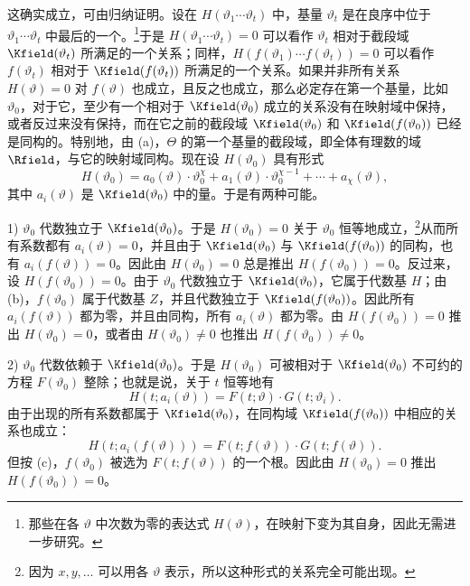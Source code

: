 这确实成立，可由归纳证明。设在 $H(\vartheta_1\cdots\vartheta_t)$ 中，基量 $\vartheta_t$ 是在良序中位于 $\vartheta_1\cdots\vartheta_t$ 中最后的一个。\footnote{那些在各 $\vartheta$ 中次数为零的表达式 $H(\vartheta)$，在映射下变为其自身，因此无需进一步研究。}于是 $H(\vartheta_1\cdots\vartheta_t)=0$ 可以看作 $\vartheta_t$ 相对于截段域 $\Kfield(\vartheta_t)$ 所满足的一个关系；同样，$H(f(\vartheta_1)\cdots f(\vartheta_t))=0$ 可以看作 $f(\vartheta_t)$ 相对于 $\Kfield(f(\vartheta_t))$ 所满足的一个关系。如果并非所有关系 $H(\vartheta)=0$ 对 $f(\vartheta)$ 也成立，且反之也成立，那么必定存在第一个基量，比如 $\vartheta_0$，对于它，至少有一个相对于 $\Kfield(\vartheta_0)$ 成立的关系没有在映射域中保持，或者反过来没有保持，而在它之前的截段域 $\Kfield(\vartheta_0)$ 和 $\Kfield(f(\vartheta_0))$ 已经是同构的。特别地，由 (a)，$\Theta$ 的第一个基量的截段域，即全体有理数的域 $\Rfield$，与它的映射域同构。现在设 $H(\vartheta_0)$ 具有形式
\[
H(\vartheta_0)=a_0(\vartheta)\cdot\vartheta_0^\chi
+a_1(\vartheta)\cdot\vartheta_0^{\chi-1}+\cdots+a_\chi(\vartheta),
\]
其中 $a_i(\vartheta)$ 是 $\Kfield(\vartheta_0)$ 中的量。于是有两种可能。

1) $\vartheta_0$ 代数独立于 $\Kfield(\vartheta_0)$。于是 $H(\vartheta_0)=0$ 关于 $\vartheta_0$ 恒等地成立，\footnote{因为 $x,y,\ldots$ 可以用各 $\vartheta$ 表示，所以这种形式的关系完全可能出现。}从而所有系数都有 $a_i(\vartheta)=0$，并且由于 $\Kfield(\vartheta_0)$ 与 $\Kfield(f(\vartheta_0))$ 的同构，也有 $a_i(f(\vartheta))=0$。因此由 $H(\vartheta_0)=0$ 总是推出 $H(f(\vartheta_0))=0$。反过来，设 $H(f(\vartheta_0))=0$。由于 $\vartheta_0$ 代数独立于 $\Kfield(\vartheta_0)$，它属于代数基 $H$；由 (b)，$f(\vartheta_0)$ 属于代数基 $Z$，并且代数独立于 $\Kfield(f(\vartheta_0))$。因此所有 $a_i(f(\vartheta))$ 都为零，并且由同构，所有 $a_i(\vartheta)$ 都为零。由 $H(f(\vartheta_0))=0$ 推出 $H(\vartheta_0)=0$，或者由 $H(\vartheta_0)\ne0$ 也推出 $H(f(\vartheta_0))\ne0$。

2) $\vartheta_0$ 代数依赖于 $\Kfield(\vartheta_0)$。于是 $H(\vartheta_0)$ 可被相对于 $\Kfield(\vartheta_0)$ 不可约的方程 $F(\vartheta_0)$ 整除；也就是说，关于 $t$ 恒等地有
\[
H(t;a_i(\vartheta))=F(t;\vartheta)\cdot G(t;\vartheta_i).
\]
由于出现的所有系数都属于 $\Kfield(\vartheta_0)$，在同构域 $\Kfield(f(\vartheta_0))$ 中相应的关系也成立：
\[
H(t;a_i(f(\vartheta)))=F(t;f(\vartheta))\cdot G(t;f(\vartheta)).
\]
但按 (c)，$f(\vartheta_0)$ 被选为 $F(t;f(\vartheta))$ 的一个根。因此由 $H(\vartheta_0)=0$ 推出 $H(f(\vartheta_0))=0$。

